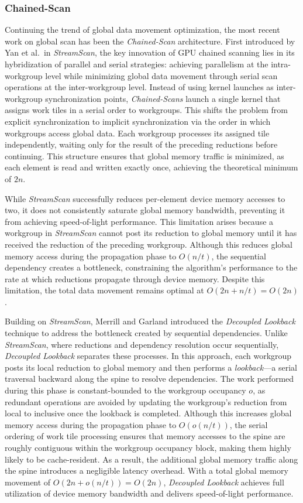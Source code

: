 \documentclass[sigconf]{acmart}
\begin{document}
\subsubsection{Chained-Scan}
Continuing the trend of global data movement optimization, the most recent work on global scan has been the \emph{Chained-Scan} architecture. First introduced by Yan et al.\ in \emph{StreamScan}, the key innovation of GPU chained scanning lies in its hybridization of parallel and serial strategies: achieving parallelism at the intra-workgroup level while minimizing global data movement through serial scan operations at the inter-workgroup level. Instead of using kernel launches as inter-workgroup synchronization points, \emph{Chained-Scans} launch a single kernel that assigns work tiles in a serial order to workgroups. This shifts the problem from explicit synchronization to implicit synchronization via the order in which workgroups access global data. Each workgroup processes its assigned tile independently, waiting only for the result of the preceding reductions before continuing. This structure ensures that global memory traffic is minimized, as each element is read and written exactly once, achieving the theoretical minimum of $2n$.

While \emph{StreamScan} successfully reduces per-element device memory accesses to two, it does not consistently saturate global memory bandwidth, preventing it from achieving speed-of-light performance. This limitation arises because a workgroup in \emph{StreamScan} cannot post its reduction to global memory until it has received the reduction of the preceding workgroup. Although this reduces global memory access during the propagation phase to $O(n/t)$, the sequential dependency creates a bottleneck, constraining the algorithm’s performance to the rate at which reductions propagate through device memory. Despite this limitation, the total data movement remains optimal at $O(2n + n/t) = O(2n)$.

Building on \emph{StreamScan}, Merrill and Garland introduced the \emph{Decoupled Lookback} technique to address the bottleneck created by sequential dependencies. Unlike \emph{StreamScan}, where reductions and dependency resolution occur sequentially, \emph{Decoupled Lookback} separates these processes. In this approach, each workgroup posts its local reduction to global memory and then performs a \emph{lookback}—a serial traversal backward along the spine to resolve dependencies. The work performed during this phase is constant-bounded to the workgroup occupancy $o$, as redundant operations are avoided by updating the workgroup's reduction from local to inclusive once the lookback is completed. Although this increases global memory access during the propagation phase to $O(o(n/t))$, the serial ordering of work tile processing ensures that memory accesses to the spine are roughly contiguous within the workgroup occupancy block, making them highly likely to be cache-resident. As a result, the additional global memory traffic along the spine introduces a negligible latency overhead. With a total global memory movement of $O(2n+o(n/t))= O(2n)$, \emph{Decoupled Lookback} achieves full utilization of device memory bandwidth and delivers speed-of-light performance.
\end{document}

